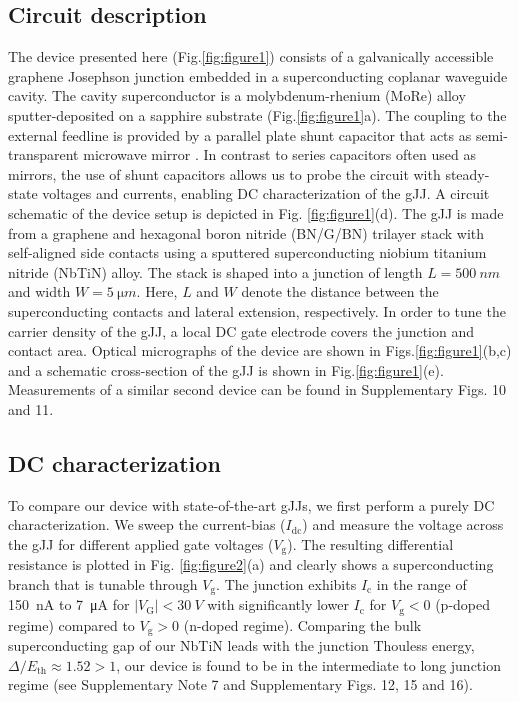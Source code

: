 \subsection{Circuit description}

The device presented here (Fig.\ref{fig:figure1}) consists of a galvanically accessible graphene Josephson junction embedded in a superconducting coplanar waveguide cavity.
The cavity superconductor is a molybdenum-rhenium (MoRe) alloy sputter-deposited on a sapphire substrate (Fig.\ref{fig:figure1}a).
The coupling to the external feedline is provided by a parallel plate shunt capacitor that acts as semi-transparent microwave mirror \cite{bosmanBroadbandArchitectureGalvanically2015c,singhMolybdenumrheniumAlloyBased2014}.
In contrast to series capacitors often used as mirrors, the use of shunt capacitors allows us to probe the circuit with steady-state voltages and currents, enabling DC characterization of the gJJ.
A circuit schematic of the device setup is depicted in Fig. \ref{fig:figure1}(d).
The gJJ is made from a graphene and hexagonal boron nitride (BN/G/BN) trilayer stack with self-aligned side contacts \cite{pizzoccheroHotPickupTechnique2016a,wangOneDimensionalElectricalContact2013b} using a sputtered superconducting niobium titanium nitride (NbTiN) alloy.
The stack is shaped into a junction of length $L=\SI{500}{nm}$ and width $W=\SI{5}{\micro m}$.
Here, $L$ and $W$ denote the distance between the superconducting contacts and lateral extension, respectively.
In order to tune the carrier density of the gJJ, a local DC gate electrode covers the junction and contact area.
Optical micrographs of the device are shown in Figs.\ref{fig:figure1}(b,c) and a schematic cross-section of the gJJ is shown in Fig.\ref{fig:figure1}(e).
Measurements of a similar second device can be found in Supplementary Figs. 10 and 11.

\subsection{DC characterization}

To compare our device with state-of-the-art gJJs, we first perform a purely DC characterization.
We sweep the current-bias ($I_\text{dc}$) and measure the voltage across the gJJ for different applied gate voltages ($V_\text{g}$).
The resulting differential resistance is plotted in Fig. \ref{fig:figure2}(a) and clearly shows a superconducting branch that is tunable through $V_\text{g}$.
The junction exhibits $I_\text{c}$ in the range of \SI{150}{nA} to \SI{7}{\micro A} for $\lvert V_\mathrm{G} \rvert<\SI{30}{V}$ with significantly lower $I_\text{c}$ for $V_\text{g}<0$ (p-doped regime) compared to $V_\text{g}>0$ (n-doped regime).
Comparing the bulk superconducting gap of our NbTiN leads with the junction Thouless energy, $\Delta/E_\text{th}\approx1.52>1$, our device is found to be in the intermediate to long junction regime (see Supplementary Note 7 and Supplementary Figs. 12, 15 and 16).

